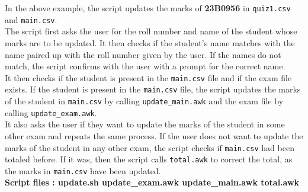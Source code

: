 \documentclass{article}
\begin{document}
In the above example, the script updates the marks of \textbf{23B0956} in \verb"quiz1.csv" and \verb"main.csv".\\
The script first asks the user for the roll number and name of the student whose marks are to be updated. It then checks if the student's name matches with the name paired up with the roll number given by the user. If the names do not match, the script confirms with the user with a prompt for the correct name.\\
It then checks if the student is present in the \verb"main.csv" file and if the exam file exists. If the student is present in the \verb"main.csv" file, the script updates the marks of the student in \verb"main.csv" by calling \verb"update_main.awk" and the exam file by calling \verb"update_exam.awk".\\
It also asks the user if they want to update the marks of the student in some other exam and repeats the same process. If the user does not want to update the marks of the student in any other exam, the script checks if \verb"main.csv" had been totaled before. If it was, then the script calls \verb"total.awk" to correct the total, as the marks in \verb"main.csv" have been updated.\\
\textbf{Script files : update.sh update\_exam.awk update\_main.awk total.awk} 
\end{document}
